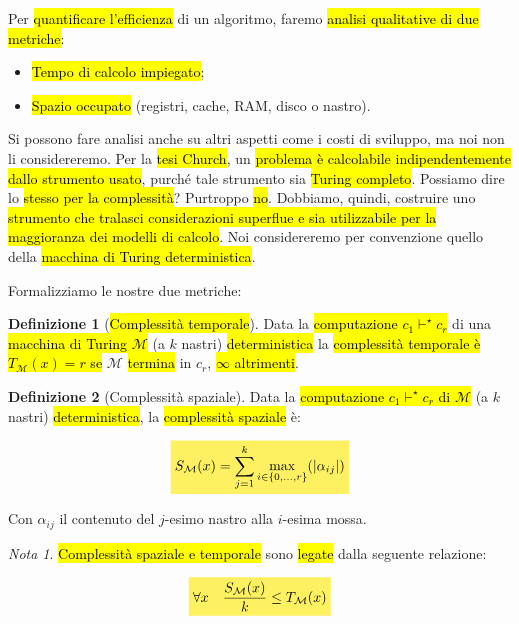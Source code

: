 \documentclass[a4paper,11pt,oneside]{article}
\theoremstyle{plain}
\theoremstyle{definition}
\newtheorem{defn}{Definizione}[section]
\theoremstyle{remark}
\newtheorem*{nota}{Nota}
\newcommand{\mhl}[1]{\colorbox{hlcolor}{$\displaystyle #1$}}
\begin{document}
Per \hl{quantificare l'efficienza} di un algoritmo, faremo \hl{analisi
qualitative di due metriche}:

\begin{itemize}
  \item \hl{Tempo di calcolo impiegato};
  \item \hl{Spazio occupato} (registri, cache, RAM, disco o nastro).
\end{itemize}

Si possono fare analisi anche su altri aspetti come i costi di sviluppo, ma noi
non li considereremo. Per la \hl{tesi Church}, un \hl{problema è calcolabile
indipendentemente dallo strumento usato}, purché tale strumento sia \hl{Turing
completo}. Possiamo dire lo \hl{stesso per la complessità}? Purtroppo \hl{no}.
Dobbiamo, quindi, costruire uno \hl{strumento che tralasci considerazioni
superflue e sia utilizzabile per la maggioranza dei modelli di calcolo}. Noi
considereremo per convenzione quello della \hl{macchina di Turing
deterministica}.

Formalizziamo le nostre due metriche:

\begin{defn}[\hl{Complessità temporale}]\label{def:comp-temporale}
  Data la \hl{computazione $c_1 \vdash^\star c_r$} di una \hl{macchina di Turing
  $\mathcal{M}$} (a $k$ nastri) \hl{deterministica} la \hl{complessità temporale
  è $T_\mathcal{M}(x) = r$ se} $\mathcal{M}$ \hl{termina} in $c_r$, \hl{$\infty$
  altrimenti}.
\end{defn}

\begin{defn}[Complessità spaziale]\label{def:comp-spaziale}
  Data la \hl{computazione $c_1 \vdash^\star c_r$ di $\mathcal{M}$} (a $k$ nastri)
  \hl{deterministica}, la \hl{complessità spaziale} è:

  \begin{equation}
    \mhl{
      S_\mathcal{M}(x) = \sum_{j=1}^{k} \max_{i \in \{0, \ldots, r\}}(|\alpha_{ij}|)
    }
  \end{equation}

  Con $\alpha_{ij}$ il contenuto del $j$-esimo nastro alla $i$-esima mossa.
\end{defn}

\begin{nota}
  \hl{Complessità spaziale e temporale} sono \hl{legate} dalla seguente
  relazione:

  \begin{equation}
    \mhl{
      \forall x \quad \frac{S_\mathcal{M}(x)}{k} \leq T_\mathcal{M}(x)
    }
  \end{equation}
\end{nota}
\end{document}
